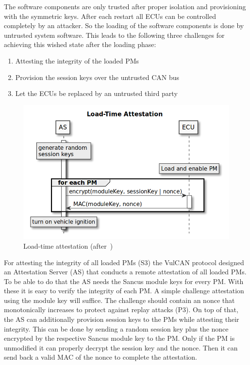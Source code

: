 The software components are only trusted after proper isolation and provisioning with the symmetric keys. After each restart all ECUs can be controlled completely by an attacker. So the loading of the software components is done by untrusted system software. This leads to the following three challenges for achieving this wished state after the loading phase:

\begin{enumerate}
    \item Attesting the integrity of the loaded PMs
    \item Provision the session keys over the untrusted CAN bus
    \item Let the ECUs be replaced by an untrusted third party
\end{enumerate}

\begin{figure}[ht]
    \centering
    \captionsetup{justification=centering}
	\includegraphics[width=1\linewidth]{Figures/VulCAN_attestation.png}
	\caption[]{Load-time attestation (after~\cite{VanBulck2017})}\label{fig:vulcan_load_attestation}
\end{figure}

For attesting the integrity of all loaded PMs (S3) the VulCAN protocol designed
an Attestation Server (AS) that conducts a remote attestation of all loaded PMs.
To be able to do that the AS needs the Sancus module keys for every PM\@. With
these it is easy to verify the integrity of each PM\@. A simple challenge
attestation using the module key will suffice. The challenge should contain an
nonce that monotonically increases to protect against replay attacks (P3). On
top of that, the AS can additionally provision session keys to the PMs while
attesting their integrity. This can be done by sending a random session key plus
the nonce encrypted by the respective Sancus module key to the PM\@. Only if the
PM is unmodified it can properly decrypt the session key and the nonce. Then it
can send back a valid MAC of the nonce to complete the attestation.


